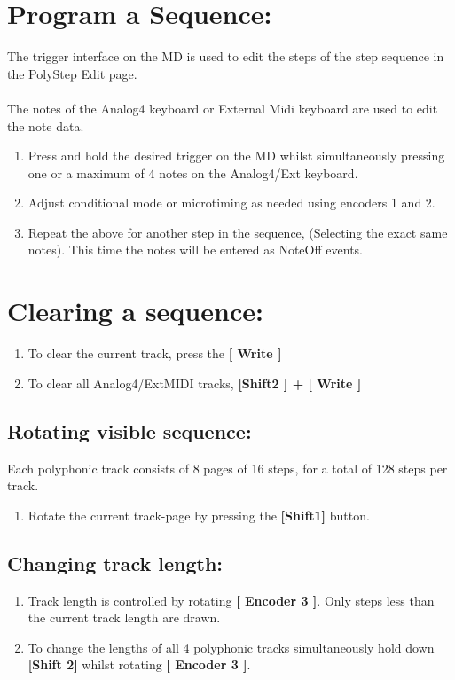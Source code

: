 \section{Program a Sequence: }
The trigger interface on the MD is used to edit the steps of the step sequence in the PolyStep Edit page.\\
\\
The notes of the Analog4 keyboard or External Midi keyboard are used to edit the note data.
\\
\begin{enumerate}
\item Press and hold the desired trigger on the MD whilst simultaneously pressing one or a maximum of 4 notes on the Analog4/Ext keyboard.
\item Adjust conditional mode or microtiming as needed using encoders 1 and 2.
\item Repeat the above for another step in the sequence, (Selecting the exact same notes). This time the notes will be entered as NoteOff events.
\end{enumerate}

\section{Clearing a sequence:}
\begin{enumerate}
\item To clear the current track, press the\textbf{ [ Write ] }
\item To clear all Analog4/ExtMIDI tracks, \textbf{[Shift2 ] + [ Write ]}
\end{enumerate}
\subsection{Rotating visible sequence:}
Each polyphonic track consists of 8 pages of 16 steps, for a total of 128 steps per track.
\begin{enumerate}
	\item Rotate the current track-page by pressing the \textbf{[Shift1] }button.
\end{enumerate}
\subsection{Changing track length:}
\begin{enumerate}
	\item Track length is controlled by rotating \textbf{[ Encoder 3 ]}. Only steps less than the current track length are drawn.
	\item To change the lengths of all 4 polyphonic tracks simultaneously hold down \textbf{[Shift 2]} whilst rotating \textbf{[ Encoder 3 ]}.
\end{enumerate}
